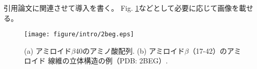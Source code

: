 引用論文\cite{ref1,ref2}に関連させて導入を書く。
Fig. \ref{figure:fibril}などとして必要に応じて画像を載せる。
\begin{figure}[h]
 \begin{center}
     \texttt{[image: figure/intro/2beg.eps]}
 \end{center}
 \caption{(a) アミロイド$\beta$40のアミノ酸配列. (b) アミロイド$\beta$（17-42）のアミロイド
 線維の立体構造の例（PDB: 2BEG）.}
 \label{figure:fibril}
\end{figure}